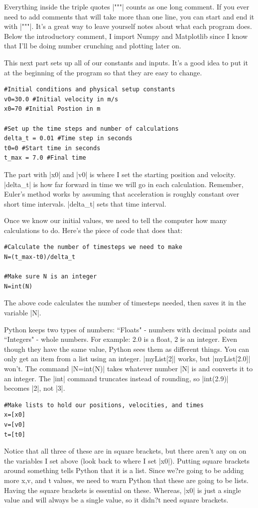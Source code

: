 \documentclass[twoside,11pt,ShortChapTitles]{BYUTextbook}
\begin{document}
Everything inside the triple quotes |"""| counts as one long comment.  If you ever need to add comments that will take more than one line, you can start and end it with |"""|.  It's a great way to leave yourself notes about what each program does.
Below the introductory comment, I import Numpy and Matplotlib since I know that I'll be doing number crunching and plotting later on.

This next part sets up all of our constants and inputs.  It's a good idea to put it at the beginning of the program so that they are easy to change.
\begin{lstlisting}
#Initial conditions and physical setup constants
v0=30.0 #Initial velocity in m/s
x0=70 #Initial Postion in m

#Set up the time steps and number of calculations
delta_t = 0.01 #Time step in seconds
t0=0 #Start time in seconds
t_max = 7.0 #Final time

\end{lstlisting}

The part with |x0| and |v0| is where I set the starting position and velocity.  |delta_t| is how far forward in time we will go in each calculation.  Remember, Euler's method works by assuming that acceleration is roughly constant over short time intervals.  |delta_t| sets that time interval.

Once we know our initial values, we need to tell the computer how many calculations to do.  Here's the piece of code that does that:

\begin{lstlisting}
#Calculate the number of timesteps we need to make
N=(t_max-t0)/delta_t

#Make sure N is an integer
N=int(N)
\end{lstlisting}

The above code calculates the number of timesteps needed, then saves it in the variable |N|. 

Python keeps two types of numbers: ``Floats" - numbers with decimal points and ``Integers" - whole numbers. For example: 2.0 is a float, 2 is an integer.  Even though they have the same value, Python sees them as different things.
You can only get an item from a list using an integer.
|myList[2]| works, but |myList[2.0]| won't.  The command |N=int(N)| takes whatever number |N| is and converts it to an integer.  The |int| command truncates instead of rounding, so |int(2.9)| becomes |2|, not |3|.

\begin{lstlisting}
#Make lists to hold our positions, velocities, and times
x=[x0]
v=[v0]
t=[t0]

\end{lstlisting}
Notice that all three of these are in square brackets, but there aren't any on on the variables I set above (look back to where I set |x0|).  
Putting square brackets around something tells Python that it is a list.  Since we?re going to be adding more x,v, and t values, we need to warn Python that these are going to be lists.
Having the square brackets is essential on these. Whereas, |x0| is just a single value and will always be a single value, so it didn?t need square brackets.
\end{document}
